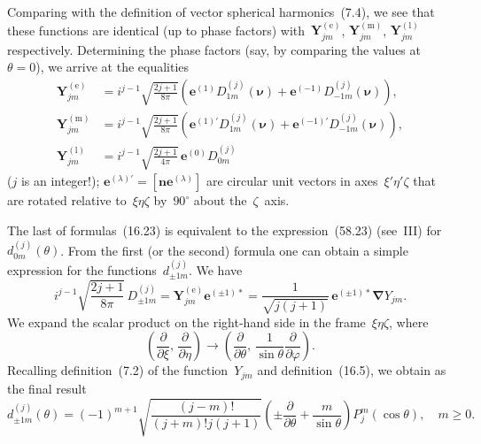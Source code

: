 Comparing with the definition of vector spherical harmonics~(7.4), we see that these functions are identical (up to phase factors) with~$\mathbf{Y}^{(\text{e})}_{jm}$, $\mathbf{Y}^{(\text{m})}_{jm}$, $\mathbf{Y}^{(\text{l})}_{jm}$ respectively. Determining the phase factors (say, by comparing the values at~$\theta = 0$), we arrive at the equalities
\begin{equation}
\begin{aligned}
\mathbf{Y}^{(\text{e})}_{jm} &= i^{j-1}\sqrt{\frac{2j+1}{8\pi}}\left(\mathbf{e}^{(1)}D^{(j)}_{1m}(\boldsymbol{\nu}) + \mathbf{e}^{(-1)}D^{(j)}_{-1m}(\boldsymbol{\nu})\right),\\[6pt]
\mathbf{Y}^{(\text{m})}_{jm} &= i^{j-1}\sqrt{\frac{2j+1}{8\pi}}\left(\mathbf{e}^{(1)'}D^{(j)}_{1m}(\boldsymbol{\nu}) + \mathbf{e}^{(-1)'}D^{(j)}_{-1m}(\boldsymbol{\nu})\right),\\[6pt]
\mathbf{Y}^{(\text{l})}_{jm} &= i^{j-1}\sqrt{\frac{2j+1}{4\pi}}\,\mathbf{e}^{(0)}D^{(j)}_{0m}
\end{aligned}
\tag{16.23}
\end{equation}
($j$ is an integer!); $\mathbf{e}^{(\lambda)'} = [\mathbf{n}\mathbf{e}^{(\lambda)}]$ are circular unit vectors in axes~$\xi'\eta'\zeta$ that are rotated relative to~$\xi\eta\zeta$ by~$90^\circ$ about the~$\zeta$~axis.

The last of formulas~(16.23) is equivalent to the expression~(58.23) (see~III) for~$d^{(j)}_{0m}(\theta)$. From the first (or the second) formula one can obtain a simple expression for the functions~$d^{(j)}_{\pm 1m}$. We have
\[
i^{j-1}\sqrt{\frac{2j+1}{8\pi}}\,D^{(j)}_{\pm 1m} = \mathbf{Y}^{(\text{e})}_{jm}\mathbf{e}^{(\pm 1)*} = \frac{1}{\sqrt{j(j+1)}}\,\mathbf{e}^{(\pm 1)*}\boldsymbol{\nabla}Y_{jm}.
\]
We expand the scalar product on the right-hand side in the frame~$\xi\eta\zeta$, where
\[
\left(\frac{\partial}{\partial\xi},\,\frac{\partial}{\partial\eta}\right) \to \left(\frac{\partial}{\partial\theta},\,\frac{1}{\sin\theta}\frac{\partial}{\partial\varphi}\right).
\]
Recalling definition~(7.2) of the function~$Y_{jm}$ and definition~(16.5), we obtain as the final result
\begin{equation}
d^{(j)}_{\pm 1m}(\theta) = (-1)^{m+1}\sqrt{\frac{(j-m)!}{(j+m)!j(j+1)}}\left(\pm\frac{\partial}{\partial\theta} + \frac{m}{\sin\theta}\right)P^m_j(\cos\theta),
\quad m \geqslant 0.
\tag{16.24}
\end{equation}
